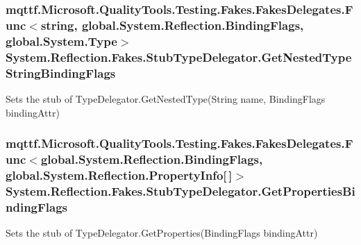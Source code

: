 \hypertarget{class_system_1_1_reflection_1_1_fakes_1_1_stub_type_delegator_a83edb77f080da08974aaa70f90a2db64}{
\subsubsection[{Get\-Nested\-Type\-String\-Binding\-Flags}]{\setlength{\rightskip}{0pt plus 5cm}mqttf.\-Microsoft.\-Quality\-Tools.\-Testing.\-Fakes.\-Fakes\-Delegates.\-Func$<$string, global.\-System.\-Reflection.\-Binding\-Flags, global.\-System.\-Type$>$ System.\-Reflection.\-Fakes.\-Stub\-Type\-Delegator.\-Get\-Nested\-Type\-String\-Binding\-Flags}}\label{class_system_1_1_reflection_1_1_fakes_1_1_stub_type_delegator_a83edb77f080da08974aaa70f90a2db64}


Sets the stub of Type\-Delegator.\-Get\-Nested\-Type(\-String name, Binding\-Flags binding\-Attr)

\hypertarget{class_system_1_1_reflection_1_1_fakes_1_1_stub_type_delegator_a3b19562cd2c8c3ebb04d351a12b5e464}{
\subsubsection[{Get\-Properties\-Binding\-Flags}]{\setlength{\rightskip}{0pt plus 5cm}mqttf.\-Microsoft.\-Quality\-Tools.\-Testing.\-Fakes.\-Fakes\-Delegates.\-Func$<$global.\-System.\-Reflection.\-Binding\-Flags, global.\-System.\-Reflection.\-Property\-Info\mbox{[}$\,$\mbox{]}$>$ System.\-Reflection.\-Fakes.\-Stub\-Type\-Delegator.\-Get\-Properties\-Binding\-Flags}}\label{class_system_1_1_reflection_1_1_fakes_1_1_stub_type_delegator_a3b19562cd2c8c3ebb04d351a12b5e464}


Sets the stub of Type\-Delegator.\-Get\-Properties(\-Binding\-Flags binding\-Attr)

